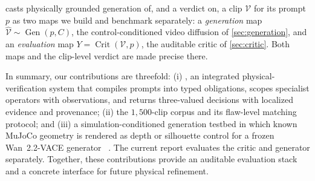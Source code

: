 \PhyReAct{} casts physically grounded generation of, and a verdict on, a clip $\mathcal{V}$ for its
prompt $p$ as two maps we build and benchmark separately: a \emph{generation} map
$\hat{\mathcal{V}}\sim\operatorname{Gen}(p,C)$, the control-conditioned video diffusion of
\cref{sec:generation}, and an \emph{evaluation} map $Y=\operatorname{Crit}(\mathcal{V},p)$, the
auditable critic of \cref{sec:critic}. Both maps and the clip-level verdict are made precise there.

In summary, our contributions are threefold: (i) \PhyReAct{}, an integrated
physical-verification system that compiles prompts into typed obligations,
scopes specialist operators with observations, and returns three-valued
decisions with localized evidence and provenance; (ii) the $1{,}500$-clip corpus
and its flaw-level matching protocol; and (iii) a simulation-conditioned
generation testbed in which known MuJoCo geometry is rendered as depth or
silhouette control for a frozen Wan~2.2-VACE generator
~\cite{todorov2012mujoco,wan2025,vace2025}. The current report evaluates the
critic and generator separately. Together, these contributions provide an
auditable evaluation stack and a concrete interface for future physical
refinement.
